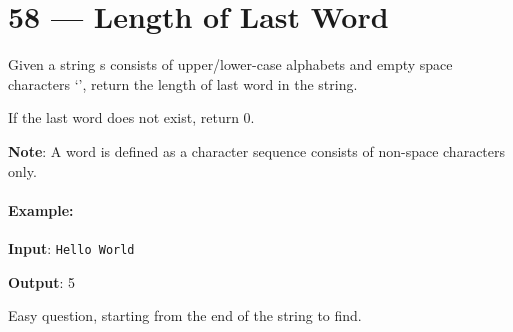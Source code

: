 \section{58 --- Length of Last Word}
Given a string s consists of upper/lower-case alphabets and empty space characters `\textvisiblespace', return the length of last word in the string.
\par
If the last word does not exist, return 0.
\par
\textbf{Note}: A word is defined as a character sequence consists of non-space characters only.
\paragraph{Example:}
\begin{flushleft}
\textbf{Input}: \texttt{Hello World}
\par
\textbf{Output}: 5
\end{flushleft}
Easy question, starting from the end of the string to find.